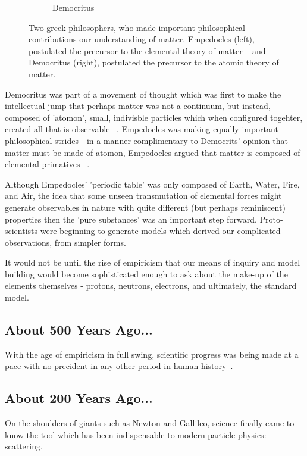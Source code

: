 \begin{figure}[H]
\begin{subfigure}{0.5\textwidth}
		\caption{Democritus}
		\label{fig:democritus}
	\end{subfigure}
	\caption{ Two greek philosophers, who made important philosophical
		contributions our understanding of matter. Empedocles (left), postulated the
		precursor to the elemental theory of matter ~\needcite{} and Democritus
		(right), postulated the precursor to the atomic theory of matter.  }
	\label{fig:atomists}
\end{figure}

Democritus was part of a movement of thought which was first to make the
intellectual jump that perhaps matter was not a continuum, but instead, composed
of 'atomon', small, indivisble particles which when configured togehter, created
all that is observable ~\needcite{}. Empedocles was making equally important
philosophical strides - in a manner complimentary to Democrits' opinion that
matter must be made of atomon, Empedocles argued that matter is composed of
elemental primatives ~\needcite{}.

Although Empedocles' 'periodic table' was only composed of Earth, Water, Fire,
and Air, the idea that some unseen transmutation of elemental forces might
generate observables in nature with quite different (but perhaps reminiscent)
properties then the 'pure substances' was an important step forward.
Proto-scientists were beginning to generate models which derived our complicated
observations, from simpler forms.

It would not be until the rise of empiricism that our means of inquiry and model
building would become sophisticated enough to ask about the make-up of the
elements themselves - protons, neutrons, electrons, and ultimately, the standard
model. 

\subsection{About 500 Years Ago...}

With the age of empiricism in full swing, scientific progress was being made at
a pace with no precident in any other period in human history~\needcite{}.

\subsection{About 200 Years Ago...}

On the shoulders of giants such as Newton and Gallileo, science finally came to
know the tool which has been indispensable to modern particle physics:
scattering.

